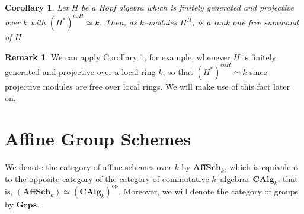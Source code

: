 \documentclass{article}
\theoremstyle{plain}
\newtheorem{Cor}[Th]{Corollary}
\theoremstyle{definition}
\newtheorem{Rem}[Th]{Remark}
\begin{document}
\begin{Cor}\label{cor:left-invariants-freesummand}
    Let $H$ be a Hopf algebra which is finitely generated and projective over $k$ with $(H^*)^{\text{co}H}\simeq k$. Then, as $k$--modules $H^H$, is a rank one free summand of $H$.
\end{Cor}

\begin{Rem}
We can apply Corollary \ref{cor:left-invariants-freesummand}, for example, whenever $H$ is finitely generated and projective over a local ring $k$, so that $(H^*)^{\text{co}H}\simeq k$ since projective modules are free over local rings. We will make use of this fact later on.    
\end{Rem}


\pagebreak




\pagebreak
\section{Affine Group Schemes}

We denote the category of affine schemes over $k$ by $\textbf{AffSch}_k$, which is equivalent to the opposite category of the category of commutative $k$--algebras $\textbf{CAlg}_k$, that is, $(\textbf{AffSch}_k)\simeq (\textbf{CAlg}_k)^{\text{op}}$. Moreover, we will denote the category of groups by $\textbf{Grps}$.
\end{document}
